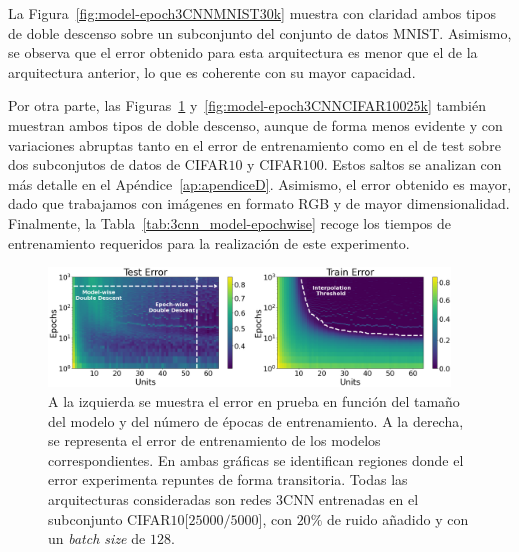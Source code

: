 La Figura~\ref{fig:model-epoch3CNNMNIST30k} muestra con claridad ambos tipos de doble descenso sobre un subconjunto del conjunto de datos MNIST. Asimismo, se observa que el error obtenido para esta arquitectura es menor que el de la arquitectura anterior, lo que es coherente con su mayor capacidad.

Por otra parte, las Figuras~\ref{fig:model-epoch3CNNCIFAR10} y~\ref{fig:model-epoch3CNNCIFAR10025k} también muestran ambos tipos de doble descenso, aunque de forma menos evidente y con variaciones abruptas tanto en el error de entrenamiento como en el de test sobre dos subconjutos de datos de CIFAR$10$ y CIFAR$100$. Estos saltos se analizan con más detalle en el Apéndice~\ref{ap:apendiceD}. Asimismo, el error obtenido es mayor, dado que trabajamos con imágenes en formato RGB y de mayor dimensionalidad. Finalmente, la Tabla~\ref{tab:3cnn_model-epochwise} recoge los tiempos de entrenamiento requeridos para la realización de este experimento.

\begin{figure}[h]
    \centering
    \includegraphics[width=0.95\textwidth]{img/experiments/model-epoch3CNNCIFAR1025k.png}
    \caption[Doble descenso en función del tamaño del modelo y del número de épocas para la red $3$CNN y un subconjunto de CIFAR$10$.]{A la izquierda se muestra el error en prueba en función del tamaño del modelo y del número de épocas de entrenamiento. A la derecha, se representa el error de entrenamiento de los modelos correspondientes. En ambas gráficas se identifican regiones donde el error experimenta repuntes de forma transitoria. Todas las arquitecturas consideradas son redes $3$CNN entrenadas en el subconjunto CIFAR$10$[$25000/5000$], con $20\%$ de ruido añadido y con un \textit{batch size} de $128$.}\label{fig:model-epoch3CNNCIFAR10}
\end{figure}

